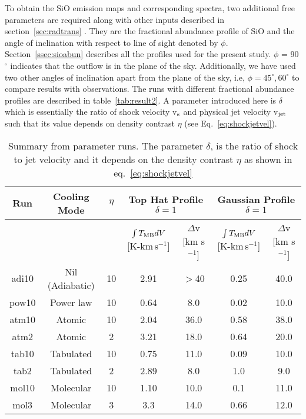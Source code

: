 \documentclass[useAMS,usenatbib]{mn2e}
\begin{document}
To obtain the SiO emission maps and corresponding
spectra, two additional free parameters are required along with other
inputs described in section~\ref{sec:radtrans} . They are
the fractional abundance profile of SiO and the angle of inclination with
respect to line of sight denoted by $\phi$. Section~\ref{ssec:sioabun}
describes all the profiles used for the present study. $\phi$ = 90$^{\circ}$ indicates that
the outflow is in the plane of the sky. 
Additionally, we have used two other angles of inclination apart from the
plane of the sky, i.e, $\phi = 45^{\circ}, 60^{\circ}$ to compare
results with observations. The runs with different fractional
abundance profiles are described in table~\ref{tab:result2}. A
parameter introduced here is $\delta$ which is essentially the ratio
of shock velocity v$_{\rm s}$ and physical jet velocity v$_{\rm
  jet}$ such that its value depends on density contrast $\eta$
(see Eq.~\ref{eq:shockjetvel}).

\begin{table*}
\centering
\caption{Summary from parameter runs. The parameter $\delta$, is the ratio of
  shock to jet velocity and it depends on the density contrast $\eta$
  as shown in eq.~\ref{eq:shockjetvel}}
\begin{tabular}{c | c | c | c | c | c | c }
\hline
Run & Cooling Mode & $\eta$ & \multicolumn{2}{|c|}{Top Hat Profile
  $\delta = 1$} & \multicolumn{2}{|c|}{Gaussian Profile $\delta =
  1$}\\
\hline\hline
&&& $\int T_{\rm MB}dV$ [K-km\,s$^{-1}$] & $\Delta$v [km s$^{-1}$] & $\int T_{\rm MB}dV$ [K-km\,s$^{-1}$] & $\Delta$v [km s$^{-1}$] \\
\hline
adi10 & Nil (Adiabatic) & 10 & 2.91 & $>$40 & 0.25 & 40.0 \\
pow10 & Power law & 10 & 0.64 & 8.0 & 0.02 & 10.0\\
atm10 & Atomic & 10 & 2.04 & 36.0 & 0.58 & 38.0 \\
atm2 & Atomic & 2 & 3.21 & 18.0 & 0.64 & 20.0 \\
tab10 & Tabulated & 10 & 0.75 & 11.0 & 0.09 & 10.0 \\
tab2 & Tabulated & 2 & 2.89 & 8.0 & 1.0 & 9.0 \\
mol10 & Molecular & 10 & 1.10 & 10.0 & 0.1 & 11.0 \\
mol3 & Molecular & 3 & 3.3 & 14.0 & 0.66 & 12.0\\
\hline
\end{tabular}
\label{tab:result1}
\end{table*}
\end{document}
